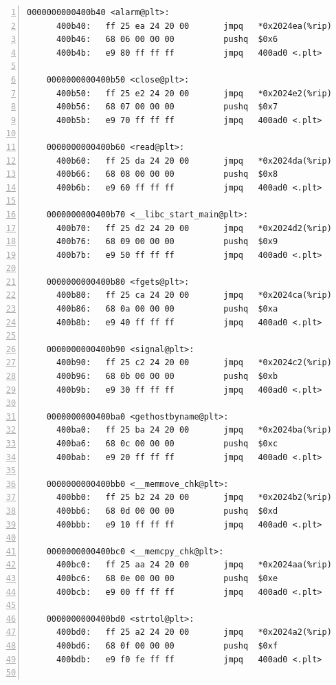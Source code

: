 \documentclass{article}
\begin{document}
\begin{lstlisting}[title = bomb的反汇编代码及部分注释, xleftmargin = 2em,xrightmargin = 2em, aboveskip = 1em, numbers = left, basicstyle=\scriptsize\ttfamily, numberstyle=\scriptsize]
    0000000000400b40 <alarm@plt>:
      400b40:	ff 25 ea 24 20 00    	jmpq   *0x2024ea(%rip)        # 603030 <alarm@GLIBC_2.2.5>
      400b46:	68 06 00 00 00       	pushq  $0x6
      400b4b:	e9 80 ff ff ff       	jmpq   400ad0 <.plt>
    
    0000000000400b50 <close@plt>:
      400b50:	ff 25 e2 24 20 00    	jmpq   *0x2024e2(%rip)        # 603038 <close@GLIBC_2.2.5>
      400b56:	68 07 00 00 00       	pushq  $0x7
      400b5b:	e9 70 ff ff ff       	jmpq   400ad0 <.plt>
    
    0000000000400b60 <read@plt>:
      400b60:	ff 25 da 24 20 00    	jmpq   *0x2024da(%rip)        # 603040 <read@GLIBC_2.2.5>
      400b66:	68 08 00 00 00       	pushq  $0x8
      400b6b:	e9 60 ff ff ff       	jmpq   400ad0 <.plt>
    
    0000000000400b70 <__libc_start_main@plt>:
      400b70:	ff 25 d2 24 20 00    	jmpq   *0x2024d2(%rip)        # 603048 <__libc_start_main@GLIBC_2.2.5>
      400b76:	68 09 00 00 00       	pushq  $0x9
      400b7b:	e9 50 ff ff ff       	jmpq   400ad0 <.plt>
    
    0000000000400b80 <fgets@plt>:
      400b80:	ff 25 ca 24 20 00    	jmpq   *0x2024ca(%rip)        # 603050 <fgets@GLIBC_2.2.5>
      400b86:	68 0a 00 00 00       	pushq  $0xa
      400b8b:	e9 40 ff ff ff       	jmpq   400ad0 <.plt>
    
    0000000000400b90 <signal@plt>:
      400b90:	ff 25 c2 24 20 00    	jmpq   *0x2024c2(%rip)        # 603058 <signal@GLIBC_2.2.5>
      400b96:	68 0b 00 00 00       	pushq  $0xb
      400b9b:	e9 30 ff ff ff       	jmpq   400ad0 <.plt>
    
    0000000000400ba0 <gethostbyname@plt>:
      400ba0:	ff 25 ba 24 20 00    	jmpq   *0x2024ba(%rip)        # 603060 <gethostbyname@GLIBC_2.2.5>
      400ba6:	68 0c 00 00 00       	pushq  $0xc
      400bab:	e9 20 ff ff ff       	jmpq   400ad0 <.plt>
    
    0000000000400bb0 <__memmove_chk@plt>:
      400bb0:	ff 25 b2 24 20 00    	jmpq   *0x2024b2(%rip)        # 603068 <__memmove_chk@GLIBC_2.3.4>
      400bb6:	68 0d 00 00 00       	pushq  $0xd
      400bbb:	e9 10 ff ff ff       	jmpq   400ad0 <.plt>
    
    0000000000400bc0 <__memcpy_chk@plt>:
      400bc0:	ff 25 aa 24 20 00    	jmpq   *0x2024aa(%rip)        # 603070 <__memcpy_chk@GLIBC_2.3.4>
      400bc6:	68 0e 00 00 00       	pushq  $0xe
      400bcb:	e9 00 ff ff ff       	jmpq   400ad0 <.plt>
    
    0000000000400bd0 <strtol@plt>:
      400bd0:	ff 25 a2 24 20 00    	jmpq   *0x2024a2(%rip)        # 603078 <strtol@GLIBC_2.2.5>
      400bd6:	68 0f 00 00 00       	pushq  $0xf
      400bdb:	e9 f0 fe ff ff       	jmpq   400ad0 <.plt>
    

\end{lstlisting}
\end{document}
